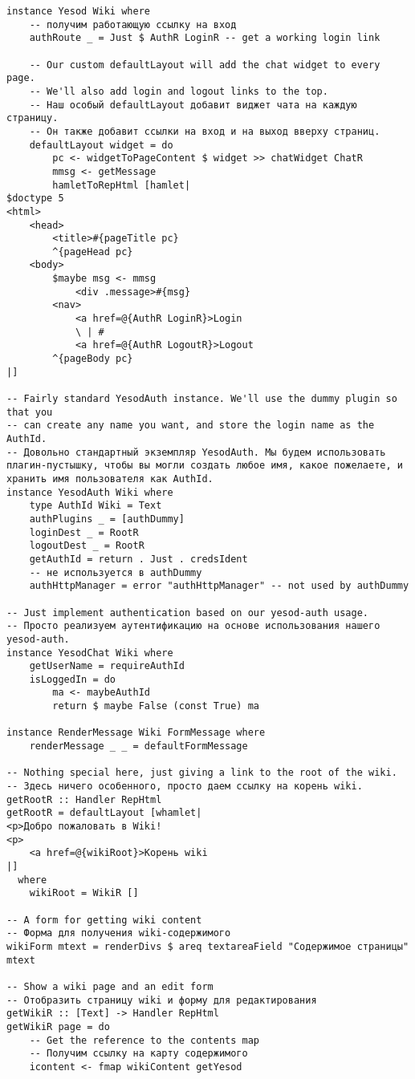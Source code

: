 \begin{lstlisting}
instance Yesod Wiki where
    -- получим работающую ссылку на вход
    authRoute _ = Just $ AuthR LoginR -- get a working login link

    -- Our custom defaultLayout will add the chat widget to every page.
    -- We'll also add login and logout links to the top.
    -- Наш особый defaultLayout добавит виджет чата на каждую страницу.
    -- Он также добавит ссылки на вход и на выход вверху страниц.
    defaultLayout widget = do
        pc <- widgetToPageContent $ widget >> chatWidget ChatR
        mmsg <- getMessage
        hamletToRepHtml [hamlet|
$doctype 5
<html>
    <head>
        <title>#{pageTitle pc}
        ^{pageHead pc}
    <body>
        $maybe msg <- mmsg
            <div .message>#{msg}
        <nav>
            <a href=@{AuthR LoginR}>Login
            \ | #
            <a href=@{AuthR LogoutR}>Logout
        ^{pageBody pc}
|]

-- Fairly standard YesodAuth instance. We'll use the dummy plugin so that you
-- can create any name you want, and store the login name as the AuthId.
-- Довольно стандартный экземпляр YesodAuth. Мы будем использовать плагин-пустышку, чтобы вы могли создать любое имя, какое пожелаете, и хранить имя пользователя как AuthId.
instance YesodAuth Wiki where
    type AuthId Wiki = Text
    authPlugins _ = [authDummy]
    loginDest _ = RootR
    logoutDest _ = RootR
    getAuthId = return . Just . credsIdent
    -- не используется в authDummy
    authHttpManager = error "authHttpManager" -- not used by authDummy

-- Just implement authentication based on our yesod-auth usage.
-- Просто реализуем аутентификацию на основе использования нашего yesod-auth.
instance YesodChat Wiki where
    getUserName = requireAuthId
    isLoggedIn = do
        ma <- maybeAuthId
        return $ maybe False (const True) ma

instance RenderMessage Wiki FormMessage where
    renderMessage _ _ = defaultFormMessage

-- Nothing special here, just giving a link to the root of the wiki.
-- Здесь ничего особенного, просто даем ссылку на корень wiki.
getRootR :: Handler RepHtml
getRootR = defaultLayout [whamlet|
<p>Добро пожаловать в Wiki!
<p>
    <a href=@{wikiRoot}>Корень wiki
|]
  where
    wikiRoot = WikiR []

-- A form for getting wiki content
-- Форма для получения wiki-содержимого
wikiForm mtext = renderDivs $ areq textareaField "Содержимое страницы" mtext

-- Show a wiki page and an edit form
-- Отобразить страницу wiki и форму для редактирования
getWikiR :: [Text] -> Handler RepHtml
getWikiR page = do
    -- Get the reference to the contents map
    -- Получим ссылку на карту содержимого
    icontent <- fmap wikiContent getYesod


\end{lstlisting}
